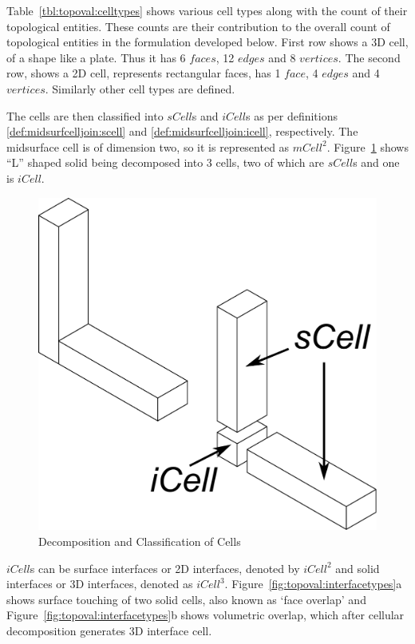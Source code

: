 \bigskip

Table~\ref{tbl:topoval:celltypes} shows various cell types along with the count of their topological entities. These counts are their contribution to the overall count of topological entities in the formulation developed below. First row shows a 3D cell, of a shape like a plate. Thus it has 6 $faces$, 12 $edges$ and 8 $vertices$. The second row, shows a 2D cell, represents rectangular faces, has 1 $face$, 4 $edges$ and 4 $vertices$. Similarly other cell types are defined.

The cells are then classified into $sCell$s and $iCell$s as per definitions \ref{def:midsurfcelljoin:scell} and \ref{def:midsurfcelljoin:icell}, respectively. The midsurface cell is of dimension two, so it is represented as $mCell^2$. Figure~\ref{fig:topoval:treekexample} shows ``L'' shaped solid being decomposed into  3 cells, two of which are $sCell$s and one is $iCell$.

\begin{figure}[!h]
\centering     %
\includegraphics[width=0.25\linewidth]{../Common/images/CellDecompExample.pdf}
\caption{Decomposition and Classification of Cells}
\label{fig:topoval:treekexample}
\end{figure}


$iCell$s can be surface interfaces or 2D interfaces, denoted by $iCell^2$ and solid interfaces or 3D interfaces, denoted as $iCell^3$. Figure~\ref{fig:topoval:interfacetypes}a shows surface touching of two solid cells, also known as `face overlap' and  Figure~\ref{fig:topoval:interfacetypes}b shows volumetric overlap, which after cellular decomposition generates 3D interface cell.

